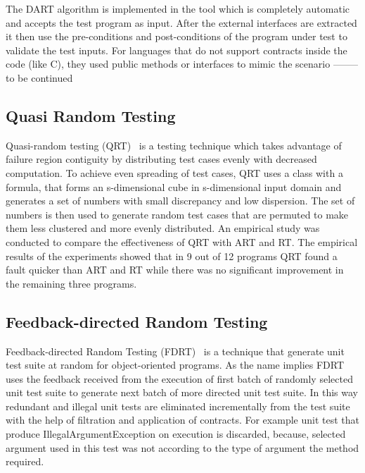 The DART algorithm is implemented in the tool which is completely automatic and accepts the test program as input. After the external interfaces are extracted it then use the pre-conditions and post-conditions of the program under test to validate the test inputs. For languages that do not support contracts inside the code (like C), they used public methods or interfaces to mimic the scenario -------- to be continued

\subsection{Quasi Random Testing}
Quasi-random testing (QRT)~\cite{Chen2005} is a testing technique which takes advantage of failure region contiguity by distributing test cases evenly with decreased computation. %
To achieve even spreading of test cases, QRT uses a class with a formula, that forms an s-dimensional cube in s-dimensional input domain and generates a set of numbers with small discrepancy and low dispersion. The set of numbers is then used to generate random test cases that are permuted to make them less clustered and more evenly distributed. An empirical study was conducted to compare the effectiveness of QRT with ART and RT. The empirical results of the experiments showed that in 9 out of 12 programs QRT found a fault quicker than ART and RT while there was no significant improvement in the remaining three programs.


\subsection{Feedback-directed Random Testing}
Feedback-directed Random Testing (FDRT)~\cite{Pacheco2007} is a technique that generate unit test suite at random for object-oriented programs. As the name implies FDRT uses the feedback received from the execution of first batch of randomly selected unit test suite to generate next batch of more directed unit test suite. In this way redundant and illegal unit tests are eliminated incrementally from the test suite with the help of filtration and application of contracts. For example unit test that produce IllegalArgumentException on execution is discarded, because, selected argument used in this test was not according to the type of argument the method required. 

